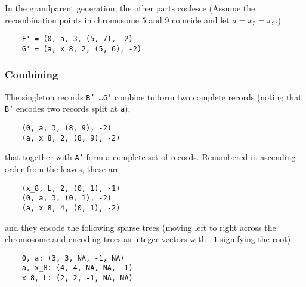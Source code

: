 \documentclass[12pt]{article}
\begin{document}
In the grandparent generation, the other parts coalesce
(Assume the recombination points in chromosome $5$ and $9$ coincide and let $a =
x_5 =x_9$.)
\begin{verbatim}
	F' = (0, a, 3, (5, 7), -2)
	G' = (a, x_8, 2, (5, 6), -2)
\end{verbatim}

\subsubsection*{Combining}

The singleton records {\tt B' \dots G'} combine to form two complete
records (noting that {\tt B'} encodes two records split at {\tt a}), 
\begin{verbatim}
	(0, a, 3, (8, 9), -2)
	(a, x_8, 2, (8, 9), -2)
\end{verbatim}
that together with {\tt A'} form a complete set of records. Renumbered in
ascending order from the leaves, these are
\begin{verbatim}
	(x_8, L, 2, (0, 1), -1)
	(0, a, 3, (0, 1), -2)
	(a, x_8, 4, (0, 1), -2)
\end{verbatim}
and they encode the following sparse trees (moving left to right across the
chromosome and encoding trees as integer vectors with {\tt -1} signifying the
root)
\begin{verbatim}
	0, a: (3, 3, NA, -1, NA)
	a, x_8: (4, 4, NA, NA, -1)
	x_8, L: (2, 2, -1, NA, NA)
\end{verbatim}

\pagebreak
\end{document}
